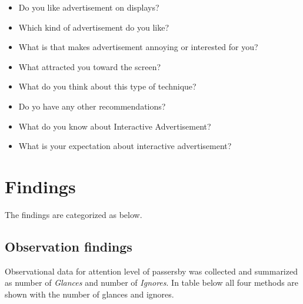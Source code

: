 \begin{itemize}
\item Do you like advertisement on displays? 
\item Which kind of advertisement do you like? 
\item What is that makes advertisement annoying or interested for you? 
\item What attracted you toward the screen? 
\item What do you think about this type of technique? 
\item Do yo have any other recommendations? 
\item What do you know about Interactive Advertisement? 
\item What is your expectation about interactive advertisement? 
\end{itemize}



\section{Findings}
The findings are categorized as below.


\subsection{Observation findings}
Observational data for attention level of passersby was collected and summarized as number of \emph{Glances} and number of \emph{Ignores}. In table below all four methods are shown with the number of glances and ignores. 

\begin{table}[H]
\caption{Cross tabulation of deployment and attention level }
\label{tab:crosstabulation}
\centering
{}
\end{table}

